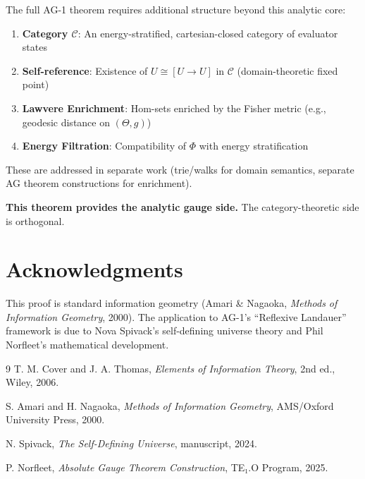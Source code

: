 \documentclass[11pt]{article}
\begin{document}
The full AG-1 theorem requires additional structure beyond this analytic core:

\begin{enumerate}
\item \textbf{Category $\mathcal{C}$}: An energy-stratified, cartesian-closed category of evaluator states
\item \textbf{Self-reference}: Existence of $U \cong [U \to U]$ in $\mathcal{C}$ (domain-theoretic fixed point)
\item \textbf{Lawvere Enrichment}: Hom-sets enriched by the Fisher metric (e.g., geodesic distance on $(\Theta, g)$)
\item \textbf{Energy Filtration}: Compatibility of $\Phi$ with energy stratification
\end{enumerate}

These are addressed in separate work (trie/walks for domain semantics, separate AG theorem constructions for enrichment).

\textbf{This theorem provides the analytic gauge side.} The category-theoretic side is orthogonal.

\section{Acknowledgments}

This proof is standard information geometry (Amari \& Nagaoka, \textit{Methods of Information Geometry}, 2000). The application to AG-1's ``Reflexive Landauer'' framework is due to Nova Spivack's self-defining universe theory and Phil Norfleet's mathematical development.

\begin{thebibliography}{9}
T. M. Cover and J. A. Thomas, \textit{Elements of Information Theory}, 2nd ed., Wiley, 2006.

S. Amari and H. Nagaoka, \textit{Methods of Information Geometry}, AMS/Oxford University Press, 2000.

N. Spivack, \textit{The Self-Defining Universe}, manuscript, 2024.

P. Norfleet, \textit{Absolute Gauge Theorem Construction}, TE₁.O Program, 2025.
\end{thebibliography}
\end{document}
